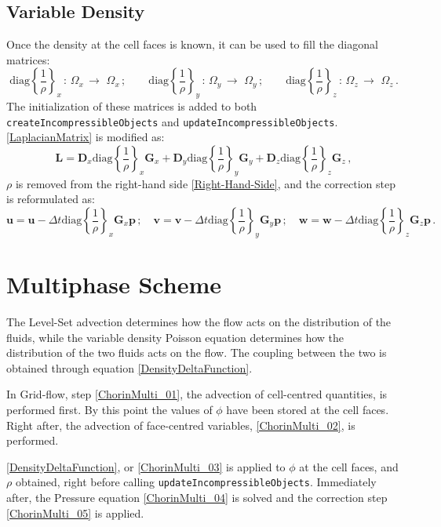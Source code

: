 \documentclass[11pt, a4paper, oneside, openany]{book}
\begin{document}
\subsection{Variable Density}\label{Subsection_Variable_Density}
Once the density at the cell faces is known, it can be used to fill the diagonal matrices:
\begin{equation*}
\mathrm{diag}\left\{\dfrac{1}{\rho}\right\}_{x}\,:\,\Omega_{x}\,\longrightarrow\,\,\Omega_{x}\,;\quad\quad\mathrm{diag}\left\{\dfrac{1}{\rho}\right\}_{y}\,:\,\Omega_{y}\,\longrightarrow\,\,\Omega_{y}\,;\quad\quad\mathrm{diag}\left\{\dfrac{1}{\rho}\right\}_{z}\,:\,\Omega_{z}\,\longrightarrow\,\,\Omega_{z}\,.
\end{equation*}
The initialization of these matrices is added to both \texttt{\small createIncompressibleObjects} and \texttt{\small updateIncompressibleObjects}. \eqref{LaplacianMatrix} is modified as:
\begin{equation}
\boldsymbol{L}=\boldsymbol{D}_{x}\mathrm{diag}\left\{\dfrac{1}{\rho}\right\}_{x}\boldsymbol{G}_{x}+\boldsymbol{D}_{y}\mathrm{diag}\left\{\dfrac{1}{\rho}\right\}_{y}\boldsymbol{G}_{y}+\boldsymbol{D}_{z}\mathrm{diag}\left\{\dfrac{1}{\rho}\right\}_{z}\boldsymbol{G}_{z}\,,\label{LaplacianMatrixVarRho}
\end{equation}
$\rho$ is removed from the right-hand side \eqref{Right-Hand-Side}, and the correction step is reformulated as:
\begin{equation*}
\boldsymbol{u}=\boldsymbol{u}-\Delta t\mathrm{diag}\left\{\dfrac{1}{\rho}\right\}_{x}\boldsymbol{G}_{x}\boldsymbol{p}\,;\quad\boldsymbol{v}=\boldsymbol{v}-\Delta t\mathrm{diag}\left\{\dfrac{1}{\rho}\right\}_{y}\boldsymbol{G}_{y}\boldsymbol{p}\,;\quad\boldsymbol{w}=\boldsymbol{w}-\Delta t\mathrm{diag}\left\{\dfrac{1}{\rho}\right\}_{z}\boldsymbol{G}_{z}\boldsymbol{p}\,.
\end{equation*}
\section{Multiphase Scheme}\label{Chapter_Implementation_Multiphase_Scheme}
The Level-Set advection determines how the flow acts on the distribution of the fluids, while the variable density Poisson equation determines how the distribution of the two fluids acts on the flow. The coupling between the two is obtained through equation \eqref{DensityDeltaFunction}.\par
In Grid-flow, step \eqref{ChorinMulti_01}, the advection of cell-centred quantities, is performed first. By this point the values of $\phi$ have been stored at the cell faces. Right after, the advection of face-centred variables, \eqref{ChorinMulti_02}, is performed.\par
\eqref{DensityDeltaFunction}, or \eqref{ChorinMulti_03} is applied to $\phi$ at the cell faces, and  $\rho $ obtained, right before calling \texttt{\small updateIncompressibleObjects}. Immediately after, the Pressure equation \eqref{ChorinMulti_04} is solved and the correction step \eqref{ChorinMulti_05} is applied.
\end{document}
